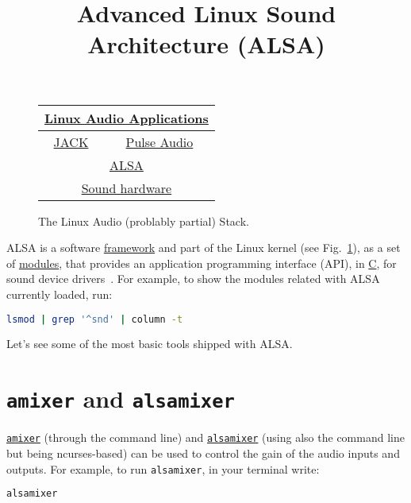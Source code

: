 \title{Advanced Linux Sound Architecture (ALSA)}

\maketitle

\begin{figure}
  \begin{center}
    \begin{tabular}{|c|c|}
      \hline
      \multicolumn{2}{c}{\href{https://en.wikipedia.org/wiki/List\_of\_Linux\_audio\_software}{Linux Audio Applications}} \\
      \hline
      \href{https://jackaudio.org/}{JACK} & \href{https://www.freedesktop.org/wiki/Software/PulseAudio/}{Pulse Audio} \\
      \hline
      \multicolumn{2}{c}{\href{https://www.alsa-project.org}{ALSA}} \\
      \hline
      \multicolumn{2}{c}{\href{https://www.alsa-project.org/wiki/Matrix:Main}{Sound hardware}} \\
      \hline
    \end{tabular}
  \end{center}
  \caption{The Linux Audio (problably partial) Stack.}
  \label{fig:stack}
\end{figure}

ALSA is a software
\href{https://docs.kernel.org/sound/kernel-api/index.html}{framework}
and part of the Linux kernel (see Fig.~\ref{fig:stack}), as a set of
\href{https://wiki.archlinux.org/title/Kernel_module}{modules}, that
provides an application programming interface (API), in
\href{https://en.wikipedia.org/wiki/C_(programming_language)}{C}, for
sound device drivers~\cite{phillips2005user}. For example, to show the
modules related with ALSA currently loaded, run:
\begin{lstlisting}[language=Bash]
lsmod | grep '^snd' | column -t
\end{lstlisting}

Let's see some of the most basic tools shipped with ALSA.

\section{\texttt{amixer} and \texttt{alsamixer}}
\texttt{\href{https://linux.die.net/man/1/amixer}{amixer}} (through
the command line) and
\texttt{\href{https://en.wikipedia.org/wiki/Alsamixer}{alsamixer}}
(using also the command line but being ncurses-based) can be used to
control the gain of the audio inputs and outputs. For example, to run
\texttt{alsamixer}, in your terminal write:
\begin{lstlisting}[language=Bash]
alsamixer
\end{lstlisting}

